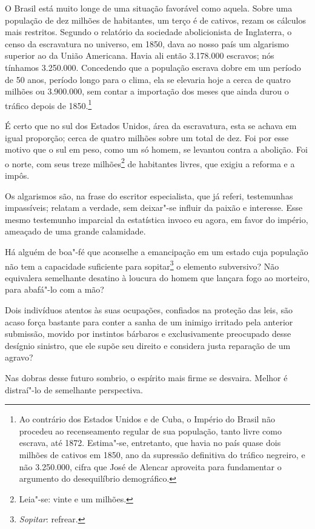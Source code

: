 \begin{linenumbers}
O Brasil está muito longe de uma situação favorável como aquela. Sobre
uma população de dez milhões de habitantes, um terço é de cativos,
rezam os cálculos mais restritos. Segundo o relatório da sociedade
abolicionista de Inglaterra, o censo da escravatura no universo, em
1850, dava ao nosso país um algarismo superior ao da União Americana.
Havia ali então 3.178.000 escravos; nós tínhamos 3.250.000. Concedendo
que a população escrava dobre em um período de 50 anos, período longo
para o clima, ela se elevaria hoje a cerca de quatro milhões ou
3.900.000, sem contar a importação dos meses que ainda durou o tráfico
depois de 1850.\footnote{ Ao contrário dos Estados Unidos e de Cuba, o Império do Brasil não
procedeu ao recenseamento regular de sua população, tanto livre como
escrava, até 1872. Estima"-se, entretanto, que havia no país quase
dois milhões de cativos em 1850, ano da supressão definitiva do tráfico
negreiro, e não 3.250.000, cifra que José de Alencar aproveita para
fundamentar o argumento do desequilíbrio demográfico.}
 

É certo que no sul dos Estados Unidos, área da escravatura, esta se
achava em igual proporção; cerca de quatro milhões sobre um total de
dez. Foi por esse motivo que o sul em peso, como um só homem, se
levantou contra a abolição. Foi o norte, com seus treze milhões\footnote{Leia"-se: vinte e um milhões.} de habitantes livres, que exigiu a reforma e a impôs.

Os algarismos são, na frase do escritor especialista, que já referi,
testemunhas impassíveis; relatam a verdade, sem deixar"-se influir da
paixão e interesse. Esse mesmo testemunho imparcial da estatística
invoco eu agora, em favor do império, ameaçado de uma grande calamidade.

Há alguém de boa"-fé que aconselhe a emancipação em um estado cuja
população não tem a capacidade suficiente para
sopitar\footnote{ \textit{Sopitar}: refrear.}
 o elemento subversivo? Não equivalera semelhante desatino à loucura do
homem que lançara fogo ao morteiro, para abafá"-lo com a mão?

Dois indivíduos atentos às suas ocupações, confiados na proteção das
leis, são acaso força bastante para conter a sanha de um inimigo
irritado pela anterior submissão, movido por instintos bárbaros e
exclusivamente preocupado desse desígnio sinistro, que ele supõe seu
direito e considera justa reparação de um agravo? 

Nas dobras desse futuro sombrio, o espírito mais firme se desvaira.
Melhor é distraí"-lo de semelhante perspectiva.


\end{linenumbers}
